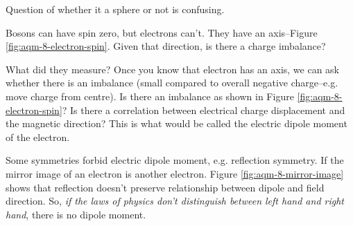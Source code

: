 \documentclass[]{article}
\begin{document}
Question of whether it a sphere or not is confusing.

Bosons can have spin zero, but electrons can't. They have an axis--Figure \ref{fig:aqm-8-electron-spin}. Given that direction, is there a charge imbalance?

What did they measure? Once you know that electron has an axis, we can ask whether there is an imbalance (small compared to overall negative charge--e.g. move charge from centre). Is there an imbalance as shown in Figure \ref{fig:aqm-8-electron-spin}? Is there a correlation between electrical charge displacement and the magnetic direction? This is what would be called the electric dipole moment of the electron.

Some symmetries forbid electric dipole moment, e.g. reflection symmetry. If the mirror image of an electron is another electron. Figure \ref{fig:aqm-8-mirror-image} shows that reflection doesn't preserve relationship between dipole and field direction. So, \emph{if the laws of physics don't distinguish between left hand and right hand}, there is no dipole moment.
\end{document}

